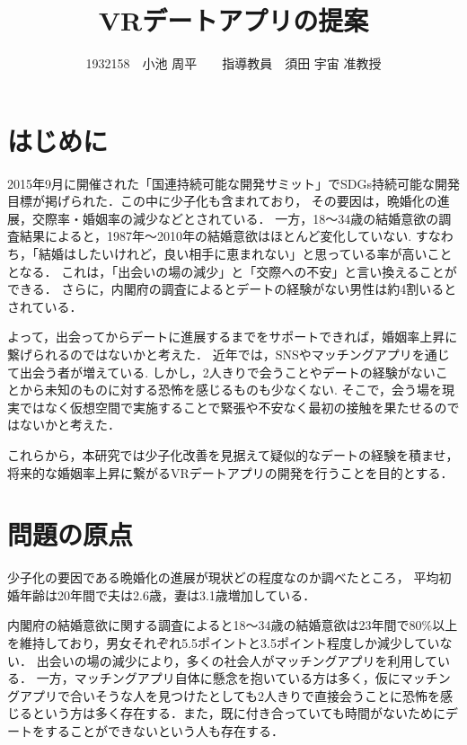 \documentclass[twocolumn,10pt,a4j]{ltjsarticle}
\title{VRデートアプリの提案}
\author{1932158　小池 周平　　指導教員　須田 宇宙 准教授}
\date{ }
\begin{document}
\maketitle

\section{はじめに}



2015年9月に開催された「国連持続可能な開発サミット」でSDGs持続可能な開発目標が掲げられた．この中に少子化も含まれており，
その要因は，晩婚化の進展\cite{sasaki2012}，交際率・婚姻率の減少\cite{naikakufu2019}などとされている．
一方，18〜34歳の結婚意欲の調査結果によると，1987年〜2010年の結婚意欲はほとんど変化していない.
すなわち，「結婚はしたいけれど，良い相手に恵まれない」と思っている率が高いこととなる\cite{naikakufu2019}．
これは，「出会いの場の減少」と「交際への不安」と言い換えることができる．
さらに，内閣府の調査によるとデートの経験がない男性は約4割いるとされている\cite{naikakufu2022}．


よって，出会ってからデートに進展するまでをサポートできれば，婚姻率上昇に繋げられるのではないかと考えた．
近年では，SNSやマッチングアプリを通じて出会う者が増えている\cite{cancan}.
しかし，2人きりで会うことやデートの経験がないことから未知のものに対する恐怖を感じるものも少なくない\cite{prtimes,yoshimura2020}.
そこで，会う場を現実ではなく仮想空間で実施することで緊張や不安なく最初の接触を果たせるのではないかと考えた．


これらから，本研究では少子化改善を見据えて疑似的なデートの経験を積ませ，将来的な婚姻率上昇に繋がるVRデートアプリの開発を行うことを目的とする．



\section{問題の原点}
少子化の要因である晩婚化の進展が現状どの程度なのか調べたところ，
平均初婚年齢は20年間で夫は2.6歳，妻は3.1歳増加している．

内閣府の結婚意欲に関する調査によると18～34歳の結婚意欲は23年間で80\%以上を維持しており，男女それぞれ5.5ポイントと3.5ポイント程度しか減少していない．
出会いの場の減少により，多くの社会人がマッチングアプリを利用している．
一方，マッチングアプリ自体に懸念を抱いている方は多く，仮にマッチングアプリで合いそうな人を見つけたとしても2人きりで直接会うことに恐怖を感じるという方は多く存在する\cite{yoshimura2020}．また，既に付き合っていても時間がないためにデートをすることができないという人も存在する．
\end{document}

